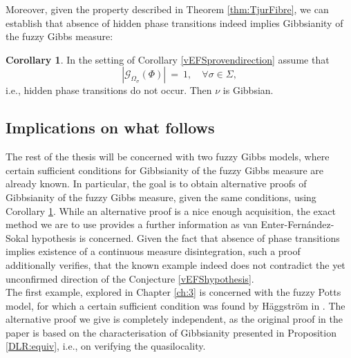 \documentclass[12pt]{article}
\newcommand{\G}{\mathcal{G}}
\newcommand{\1}{\mathbbm{1}}
\newcommand{\5}{\vspace{0.5cm}}
\theoremstyle{definition}
\newtheorem{cor}[thm]{Corollary}
\begin{document}
Moreover, given the property described in Theorem \ref{thm:TjurFibre}, we can establish that absence of hidden phase transitions indeed implies Gibbsianity of the fuzzy Gibbs measure:
\begin{cor}\label{Berghout}
In the setting of Corollary \ref{vEFSprovendirection} assume that 
$$|\G_{\Omega_\sigma}(\Phi)| ~=~ 1, \quad \forall \sigma\in\Sigma,$$
i.e., hidden phase transitions do not occur. Then $\nu$ is Gibbsian.
\end{cor}


\subsection{Implications on what follows}

The rest of the thesis will be concerned with two fuzzy Gibbs models, where certain sufficient conditions for Gibbsianity of the fuzzy Gibbs measure are already known. In particular, the goal is to obtain alternative proofs of Gibbsianity of the fuzzy Gibbs measure, given the same conditions, using Corollary \ref{Berghout}. While an alternative proof is a nice enough acquisition, the exact method we are to use provides a further information as van Enter-Fern\'andez-Sokal hypothesis is concerned. Given the fact that absence of phase transitions implies existence of a continuous measure disintegration, such a proof additionally verifies, that the known example indeed does not contradict the yet unconfirmed direction of the Conjecture \ref{vEFShypothesis}.\\

The first example, explored in Chapter \ref{ch:3} is concerned with the fuzzy Potts model, for which a certain sufficient condition was found by H\"aggstr\"om in \cite{Hag}. The alternative proof we give is completely independent, as the original proof in the paper is based on the characterisation of Gibbsianity presented in Proposition \ref{DLR:equiv}, i.e., on verifying the quasilocality. \\
\end{document}
